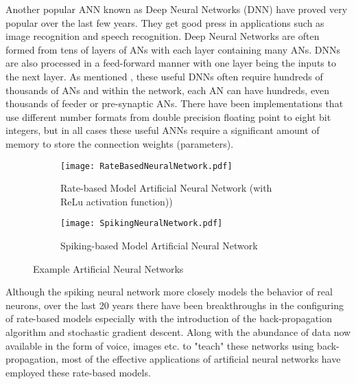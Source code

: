 Another popular ANN known as Deep Neural Networks (DNN) have proved very popular over the last few years. They get good press in applications such as image recognition and speech recognition. 
Deep Neural Networks are often formed from tens of layers of ANs with each layer containing many ANs. DNNs are also processed in a feed-forward manner with one layer being the inputs to the next layer. 
As mentioned \cite{krizhevsky2012imagenet}, these useful DNNs often require hundreds of thousands of ANs and within the network, each AN can have hundreds, even thousands of feeder or pre-synaptic ANs.
There have been implementations that use different number formats from double precision floating point to eight bit integers, but in all cases these useful ANNs require a significant amount of memory to store the connection weights (parameters).


\begin{figure}[!t]
  \centering
  \captionsetup{justification=centering}
  \captionsetup{width=.9\linewidth}
  \begin{subfigure}{.9\textwidth}
    \centerline{
    \mbox{\texttt{[image: RateBasedNeuralNetwork.pdf]}}
    }
    \caption{Rate-based Model Artificial Neural Network (with ReLu activation function))}
    \label{fig:Rate-based Model Network}
  \end{subfigure}
  
  \begin{subfigure}{.9\textwidth}
    \centerline{
    \mbox{\texttt{[image: SpikingNeuralNetwork.pdf]}}
    }
    \caption{Spiking-based Model Artificial Neural Network}
    \label{fig:Spiking Model Network}
  \end{subfigure}
  \caption{Example Artificial Neural Networks}
  \label{Example Artificial Neural Networks}
\end{figure}

Although the spiking neural network more closely models the behavior of real neurons, over the last 20 years there 
have been breakthroughs in the configuring of rate-based models especially with the introduction of the back-propagation
algorithm and stochastic gradient descent. Along with the abundance of data now available in the form of voice, images etc. to "teach" these networks
using back-propagation, most of the effective applications of artificial neural networks have employed these rate-based models.

\iffalse
Our research will focus on these rate-based models which we will now refer to as ANNs.
\fi


